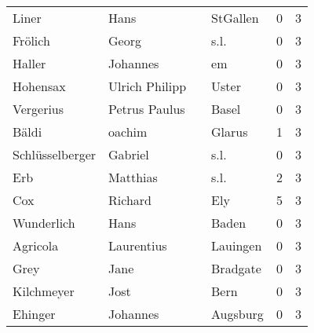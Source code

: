 \begin{tabular}{llllrr}
                    Liner &                               Hans &             &                                    StGallen &          0 &         3 \\
                  Frölich &                              Georg &             &                                        s.l. &          0 &         3 \\
                   Haller &                           Johannes &             &                                          em &          0 &         3 \\
                 Hohensax &                     Ulrich Philipp &             &                                       Uster &          0 &         3 \\
                Vergerius &                      Petrus Paulus &             &                                       Basel &          0 &         3 \\
                    Bäldi &                             oachim &             &                                      Glarus &          1 &         3 \\
          Schlüsselberger &                            Gabriel &             &                                        s.l. &          0 &         3 \\
                      Erb &                           Matthias &             &                                        s.l. &          2 &         3 \\
                      Cox &                            Richard &             &                                         Ely &          5 &         3 \\
               Wunderlich &                               Hans &             &                                       Baden &          0 &         3 \\
                 Agricola &                         Laurentius &             &                                    Lauingen &          0 &         3 \\
                     Grey &                               Jane &             &                                    Bradgate &          0 &         3 \\
               Kilchmeyer &                               Jost &             &                                        Bern &          0 &         3 \\
                  Ehinger &                           Johannes &             &                                    Augsburg &          0 &         3 \\

\end{tabular}
